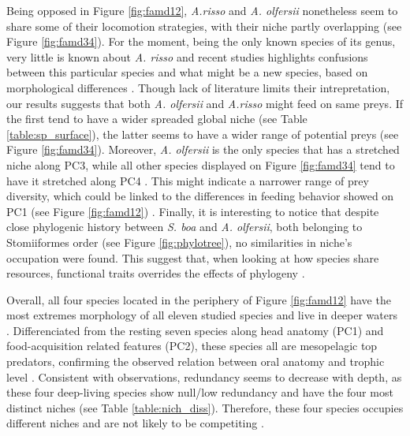 Being opposed in Figure \ref{fig:famd12}, \textit{A.risso} and \textit{A. olfersii} nonetheless seem to share some of their locomotion strategies, with their niche partly overlapping (see Figure \ref{fig:famd34}). For the moment, being the only known species of its genus, very little is known about \textit{A. risso} and recent studies highlights confusions between this particular species and what might be a new species, based on morphological differences \citep{ho2019}. Though lack of literature limits their intrepretation, our results suggests that both \textit{A. olfersii} and \textit{A.risso} might feed on same preys. If the first tend to have a wider spreaded global niche (see Table \ref{table:sp_surface}), the latter seems to have a wider range of potential preys (see Figure \ref{fig:famd34}). Moreover, \textit{A. olfersii} is the only species that has a stretched niche along PC3, while all other species displayed on Figure \ref{fig:famd34} tend to have it stretched along PC4 . This might indicate a narrower range of prey diversity, which could be linked to the differences in feeding behavior showed on PC1 (see Figure \ref{fig:famd12}) . Finally, it is interesting to notice that despite close phylogenic history between \textit{S. boa} and \textit{A. olfersii}, both belonging to Stomiiformes order (see Figure \ref{fig:phylotree}), no similarities in niche's occupation were found. This suggest that, when looking at how species share resources, functional traits overrides the effects of phylogeny \citep{kremer2017}. 

Overall, all four species located in the periphery of Figure \ref{fig:famd12} have the most extremes morphology of all eleven studied species and live in deeper waters \citep{froese2019}. Differenciated from the resting seven species along head anatomy (PC1) and food-acquisition related features (PC2), these species all are mesopelagic top predators, confirming the observed relation between oral anatomy and trophic level \citep{colborne2013,wainwright1995}. Consistent with \citet{farre2016} observations, redundancy seems to decrease with depth, as these four deep-living species show null/low redundancy and have the four most distinct niches (see Table \ref{table:nich_diss}). Therefore, these four species occupies different niches and are not likely to be competiting \citep{mouillot2005}.

